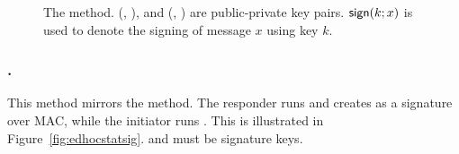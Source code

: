 \begin{figure}[h]
{}
    \caption{The \mSigStat{} method. (\mCredi{}, \mLtki), and
        (\mCredr{}, \mLtkr{}) are public-private key pairs. $\textsf{sign}(k; x)$ is
    used to denote the signing of message $x$ using key $k$.}
\label{fig:edhocsigstat}
\end{figure}

\spacehack
\subsubsection{\mStatSig.}
This method mirrors the \mSigStat{} method.
%
The responder runs \mSig{} and creates \mAuthr{} as a signature over MAC,
while the initiator runs \mStat{}.
%
This is illustrated in Figure~\ref{fig:edhocstatsig}. \mCredr{} and \mLtkr{}
must be signature keys.
%

